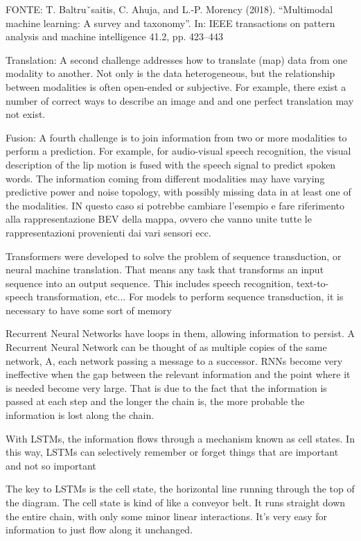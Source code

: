FONTE:
T. Baltruˇsaitis, C. Ahuja, and L.-P. Morency (2018). “Multimodal machine learning: A survey and taxonomy”. In: IEEE transactions on pattern
analysis and machine intelligence 41.2, pp. 423–443

Translation: A second challenge addresses how to translate (map) data
from one modality to another. Not only is the data heterogeneous, but
the relationship between modalities is often open-ended or subjective.
For example, there exist a number of correct ways to describe an image
and and one perfect translation may not exist.

Fusion: A fourth challenge is to join information from two or more
modalities to perform a prediction.
For example, for audio-visual speech recognition, the visual description of
the lip motion is fused with the speech signal to predict spoken words.
The information coming from different modalities may have varying
predictive power and noise topology, with possibly missing data in at least
one of the modalities. IN questo caso si potrebbe cambiare l'esempio e fare riferimento alla rappresentazione BEV della mappa, ovvero che vanno unite tutte le rappresentazioni provenienti dai vari sensori ecc. 

Transformers were developed to solve the problem of sequence transduction, or
neural machine translation.
That means any task that transforms an input sequence into an output
sequence. This includes speech recognition, text-to-speech transformation,
etc...
For models to perform sequence transduction, it is necessary to have some sort
of memory

Recurrent Neural Networks have loops in them, allowing information to persist.
A Recurrent Neural Network can be thought of as multiple copies of the same
network, A, each network passing a message to a successor.
RNNs become very ineffective when the gap between the relevant information
and the point where it is needed become very large.
That is due to the fact that the information is passed at each step and the
longer the chain is, the more probable the information is lost along the chain.

With LSTMs, the information flows through a mechanism known as cell states.
In this way, LSTMs can selectively remember or forget things that are
important and not so important

The key to LSTMs is the cell state, the horizontal line running through the top
of the diagram.
The cell state is kind of like a conveyor belt. It runs straight down the entire
chain, with only some minor linear interactions. It’s very easy for information
to just flow along it unchanged.

